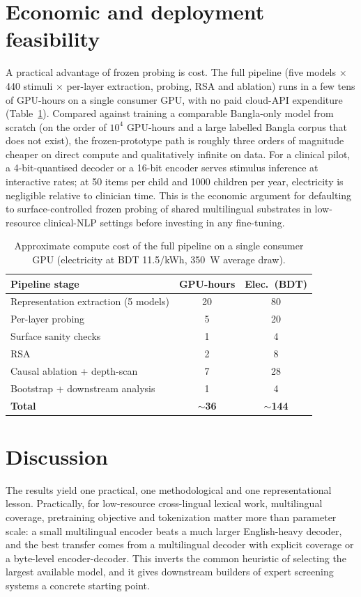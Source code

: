 \documentclass[preprint,12pt]{elsarticle}
\begin{document}
\section{Economic and deployment feasibility}
\label{sec:cost}
A practical advantage of frozen probing is cost. The full pipeline (five models $\times$ 440 stimuli $\times$ per-layer extraction, probing, RSA and ablation) runs in a few tens of GPU-hours on a single consumer GPU, with no paid cloud-API expenditure (Table~\ref{tab:cost}). Compared against training a comparable Bangla-only model from scratch (on the order of $10^{4}$ GPU-hours and a large labelled Bangla corpus that does not exist), the frozen-prototype path is roughly three orders of magnitude cheaper on direct compute and qualitatively infinite on data. For a clinical pilot, a 4-bit-quantised decoder or a 16-bit encoder serves stimulus inference at interactive rates; at 50 items per child and 1000 children per year, electricity is negligible relative to clinician time. This is the economic argument for defaulting to surface-controlled frozen probing of shared multilingual substrates in low-resource clinical-NLP settings before investing in any fine-tuning.

\begin{table}[H]
\caption{Approximate compute cost of the full pipeline on a single consumer GPU (electricity at BDT 11.5/kWh, 350~W average draw).}
\label{tab:cost}
\centering
\small
\setlength{\tabcolsep}{5pt}
\begin{tabular}{lcc}
\toprule
\textbf{Pipeline stage} & \textbf{GPU-hours} & \textbf{Elec.\ (BDT)} \\
\midrule
Representation extraction (5 models) & 20 & 80 \\
Per-layer probing & 5 & 20 \\
Surface sanity checks & 1 & 4 \\
RSA & 2 & 8 \\
Causal ablation + depth-scan & 7 & 28 \\
Bootstrap + downstream analysis & 1 & 4 \\
\midrule
\textbf{Total} & \textbf{$\sim$36} & \textbf{$\sim$144} \\
\bottomrule
\end{tabular}
\end{table}

\section{Discussion}
\label{sec:discussion}
The results yield one practical, one methodological and one representational lesson. Practically, for low-resource cross-lingual lexical work, multilingual coverage, pretraining objective and tokenization matter more than parameter scale: a small multilingual encoder beats a much larger English-heavy decoder, and the best transfer comes from a multilingual decoder with explicit coverage or a byte-level encoder-decoder. This inverts the common heuristic of selecting the largest available model, and it gives downstream builders of expert screening systems a concrete starting point.
\end{document}
